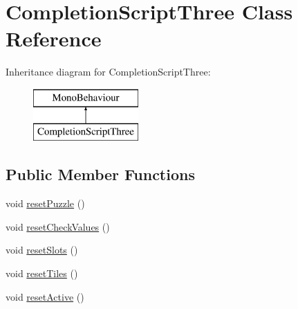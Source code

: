 \hypertarget{class_completion_script_three}{}\section{Completion\+Script\+Three Class Reference}
\label{class_completion_script_three}
Inheritance diagram for Completion\+Script\+Three\+:\begin{figure}[H]
\begin{center}
\leavevmode
\includegraphics[height=2.000000cm]{class_completion_script_three}
\end{center}
\end{figure}
\subsection*{Public Member Functions}
\begin{DoxyCompactItemize}
\item 
void \hyperlink{class_completion_script_three_a7749647b14b9baf2459c820793551619}{reset\+Puzzle} ()
\item 
void \hyperlink{class_completion_script_three_a45aeee9d673720976534b708fa30d4ba}{reset\+Check\+Values} ()
\item 
void \hyperlink{class_completion_script_three_affbd153c776b7addec8cc060214d1971}{reset\+Slots} ()
\item 
void \hyperlink{class_completion_script_three_aa4c115e628a51c3465153aefa5c80c13}{reset\+Tiles} ()
\item 
void \hyperlink{class_completion_script_three_a1db60c85017b1469f792649b75e9397b}{reset\+Active} ()
\end{DoxyCompactItemize}
